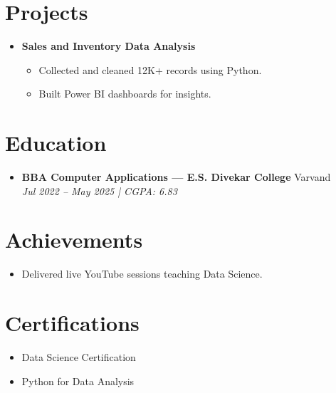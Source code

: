 \documentclass[letterpaper,10.8pt]{article}
\begin{document}
\section{Projects}
\begin{itemize}[leftmargin=0.15in]

    \item
    \textbf{Sales and Inventory Data Analysis}
    \begin{itemize}
        \item Collected and cleaned 12K+ records using Python.
        \item Built Power BI dashboards for insights.
    \end{itemize}

\end{itemize}

\section{Education}
\begin{itemize}[leftmargin=0.15in, label={}]

    \item
    \textbf{BBA Computer Applications --- E.S. Divekar College} \hfill Varvand \\
    \textit{Jul 2022 -- May 2025 | CGPA: 6.83}

\end{itemize}


\section{Achievements}
\begin{itemize}[leftmargin=0.15in]
    \item Delivered live YouTube sessions teaching Data Science.
\end{itemize}



\section{Certifications}
\begin{itemize}[leftmargin=0.15in]
    \item Data Science Certification
    \item Python for Data Analysis
\end{itemize}
\end{document}
